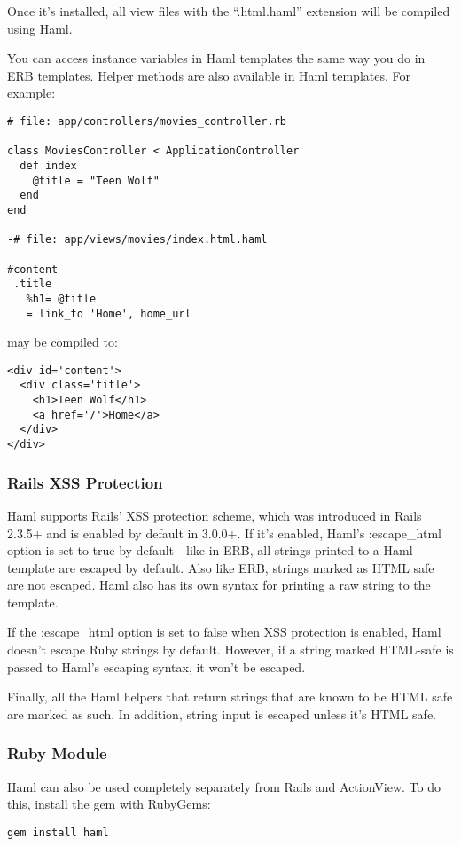 \documentclass[10pt]{article}
\begin{document}
 Once it’s installed, all view files with the ``.html.haml'' extension will be compiled using Haml.


 You can access instance variables in Haml templates the same way you do in ERB templates. Helper methods are also available in Haml templates. For example:
\begin{verbatim}
# file: app/controllers/movies_controller.rb

class MoviesController < ApplicationController
  def index
    @title = "Teen Wolf"
  end
end

-# file: app/views/movies/index.html.haml

#content
 .title
   %h1= @title
   = link_to 'Home', home_url
\end{verbatim}


 may be compiled to:
\begin{verbatim}
<div id='content'>
  <div class='title'>
    <h1>Teen Wolf</h1>
    <a href='/'>Home</a>
  </div>
</div>
\end{verbatim}
\subsubsection*{Rails XSS Protection}


 Haml supports Rails’ XSS protection scheme, which was introduced in Rails 2.3.5+ and is enabled by default in 3.0.0+. If it’s enabled, Haml’s :escape\_html option is set to true by default - like in ERB, all strings printed to a Haml template are escaped by default. Also like ERB, strings marked as HTML safe are not escaped. Haml also has its own syntax for printing a raw string to the template.


 If the :escape\_html option is set to false when XSS protection is enabled, Haml doesn’t escape Ruby strings by default. However, if a string marked HTML-safe is passed to Haml’s escaping syntax, it won’t be escaped.


 Finally, all the Haml helpers that return strings that are known to be HTML safe are marked as such. In addition, string input is escaped unless it’s HTML safe.
\subsubsection*{Ruby Module}


 Haml can also be used completely separately from Rails and ActionView. To do this, install the gem with RubyGems:
\begin{verbatim}
gem install haml
\end{verbatim}
\end{document}
